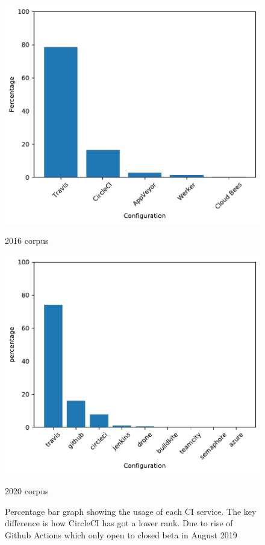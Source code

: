 \documentclass[10pt,conference]{IEEEtran}
\begin{document}
\begin{figure}[!htbp]
  \centering
  \begin{minipage}{.48\textwidth}
    \centering
    \includegraphics[width=\textwidth]{../src/results/comparison_config_bar.pdf}
    \caption[]{2016 corpus}
    \label{graph:config_bar2016}
  \end{minipage}
  \begin{minipage}{.48\textwidth}
    \centering
  \includegraphics[width=\textwidth]{../src/results/config-topn.pdf}
  \caption[]{2020 corpus}
  \label{graph:config_bar2020}
  \end{minipage}
  \caption[]{Percentage bar graph showing the usage of each CI service. The key difference is how CircleCI has got a lower rank. Due to rise of Github Actions which only open to closed beta in August 2019}
  \label{graph:config_bars}

\end{figure}
\end{document}
